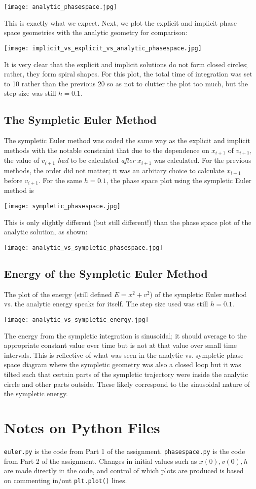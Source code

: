 \documentclass{article}
\begin{document}
\texttt{[image: analytic\_phasespace.jpg]}

This is exactly what we expect. Next, we plot the explicit and implicit phase space geometries with the analytic geometry for comparison:

\texttt{[image: implicit\_vs\_explicit\_vs\_analytic\_phasespace.jpg]}

It is very clear that the explicit and implicit solutions do not form closed circles; rather, they form spiral shapes. For this plot, the total time of integration was set to 10 rather than the previous 20 so as not to clutter the plot too much, but the step size was still $ h = 0.1 $.

\subsection{The Sympletic Euler Method}
The sympletic Euler method was coded the same way as the explicit and implicit methods with the notable constraint that due to the dependence on $ x_{i+1} $ of $ v_{i+1} $, the value of $ v_{i+1} $ \textit{had} to be calculated \textit{after} $ x_{i+1} $ was calculated. For the previous methods, the order did not matter; it was an arbitary choice to calculate $ x_{i+1} $ before $ v_{i+1} $. For the same $ h = 0.1 $, the phase space plot using the sympletic Euler method is

\texttt{[image: sympletic\_phasespace.jpg]}

This is only slightly different (but still different!) than the phase space plot of the analytic solution, as shown:

\texttt{[image: analytic\_vs\_sympletic\_phasespace.jpg]}
\subsection{Energy of the Sympletic Euler Method}
The plot of the energy (still defined $ E = x^2 + v^2 $) of the sympletic Euler method vs. the analytic energy speaks for itself. The step size used was still $ h = 0.1 $.

\texttt{[image: analytic\_vs\_sympletic\_energy.jpg]}

The energy from the sympletic integration is sinusoidal; it should average to the appropriate constant value over time but is not at that value over small time intervals. This is reflective of what was seen in the analytic vs. sympletic phase space diagram where the sympletic geometry was also a closed loop but it was tilted such that certain parts of the sympletic trajectory were inside the analytic circle and other parts outside. These likely correspond to the sinusoidal nature of the sympletic energy.

\section{Notes on Python Files}
\texttt{euler.py} is the code from Part 1 of the assignment. \texttt{phasespace.py} is the code from Part 2 of the assignment. Changes in initial values such as $ x(0), v(0), h $ are made directly in the code, and control of which plots are produced is based on commenting in/out \texttt{plt.plot()} lines.
\end{document}
